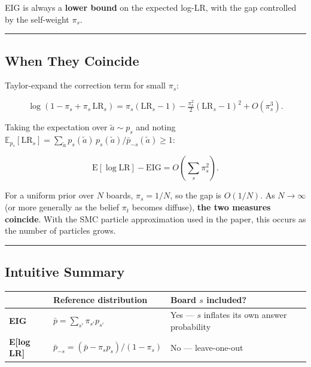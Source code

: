 \documentclass[
]{article}
\begin{document}
EIG is always a \textbf{lower bound} on the expected log-LR, with the
gap controlled by the self-weight \(\pi_s\).

\begin{center}\rule{0.5\linewidth}{0.5pt}\end{center}

\subsection{When They Coincide}\label{when-they-coincide}

Taylor-expand the correction term for small \(\pi_s\):

\[\log(1 - \pi_s + \pi_s\,\mathrm{LR}_s) = \pi_s(\mathrm{LR}_s - 1) - \tfrac{\pi_s^2}{2}(\mathrm{LR}_s-1)^2 + O(\pi_s^3).\]

Taking the expectation over \(\tilde{a} \sim p_s\) and noting
\(\mathbb{E}_{p_s}[\mathrm{LR}_s] = \sum_{\tilde a} p_s(\tilde a)\,p_s(\tilde a)/\bar p_{-s}(\tilde a) \geq 1\):

\[\mathrm{E}[\log \mathrm{LR}] - \mathrm{EIG} = O\!\left(\sum_s \pi_s^2\right).\]

For a uniform prior over \(N\) boards, \(\pi_s = 1/N\), so the gap is
\(O(1/N)\). As \(N\to\infty\) (or more generally as the belief \(\pi_t\)
becomes diffuse), \textbf{the two measures coincide}. With the SMC
particle approximation used in the paper, this occurs as the number of
particles grows.

\begin{center}\rule{0.5\linewidth}{0.5pt}\end{center}

\subsection{Intuitive Summary}\label{intuitive-summary}

\begin{longtable}[]{@{}
  >{\raggedright\arraybackslash}p{}
  >{\raggedright\arraybackslash}p{}
  >{\raggedright\arraybackslash}p{}@{}}
\toprule\noalign{}
\begin{minipage}[b]{\linewidth}\raggedright
\end{minipage} & \begin{minipage}[b]{\linewidth}\raggedright
Reference distribution
\end{minipage} & \begin{minipage}[b]{\linewidth}\raggedright
Board \(s\) included?
\end{minipage} \\
\midrule\noalign{}
\endhead
\bottomrule\noalign{}
\endlastfoot
\textbf{EIG} & \(\bar p = \sum_{s'}\pi_{s'} p_{s'}\) & Yes --- \(s\)
inflates its own answer probability \\
\textbf{E{[}log LR{]}} &
\(\bar p_{-s} = (\bar p - \pi_s p_s)/(1-\pi_s)\) & No ---
leave-one-out \\
\end{longtable}
\end{document}

